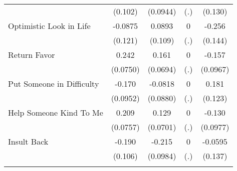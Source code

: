 {\begin{tabular}{l*{4}{c}}
            &     (0.102)         &    (0.0944)         &         (.)         &     (0.130)         \\
[1em]
Optimistic Look in Life&     -0.0875         &      0.0893         &           0         &      -0.256         \\
            &     (0.121)         &     (0.109)         &         (.)         &     (0.144)         \\
[1em]
Return Favor&       0.242\sym{**} &       0.161\sym{*}  &           0         &      -0.157         \\
            &    (0.0750)         &    (0.0694)         &         (.)         &    (0.0967)         \\
[1em]
Put Someone in Difficulty&      -0.170         &     -0.0818         &           0         &       0.181         \\
            &    (0.0952)         &    (0.0880)         &         (.)         &     (0.123)         \\
[1em]
Help Someone Kind To Me&       0.209\sym{**} &       0.129         &           0         &      -0.130         \\
            &    (0.0757)         &    (0.0701)         &         (.)         &    (0.0977)         \\
[1em]
Insult Back &      -0.190         &      -0.215\sym{*}  &           0         &     -0.0595         \\
            &     (0.106)         &    (0.0984)         &         (.)         &     (0.137)         \\
\hline\hline
{}\\
\end{tabular}
}

